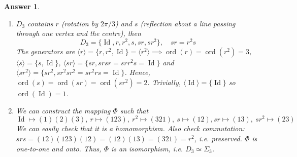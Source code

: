 \documentclass[a4paper]{article}
\DeclareMathOperator{\ord}{ord}
\DeclareMathOperator{\Id}{Id}
\newtheorem{ans}{Answer}[section]
\theoremstyle{new}
\begin{document}
\begin{ans}
\begin{enumerate}[label=(\roman*)]
\begin{enumerate}[label=(\alph*)]
\item $D_3$ contains $r$ (rotation by $2\pi/3$) and $s$ (reflection about a line passing through one vertex and the centre), then 
$$D_3=\{\Id,r,r^2,s,sr,sr^2\},\quad sr=r^2s$$
The generators are $\langle r\rangle=\{r,r^2,\Id\}=\langle r^2\rangle\implies\ord(r)=\ord(r^2)=3$, $\langle s\rangle=\{s,\Id\}$, $\langle sr\rangle=\{sr,srsr=srr^2s=\Id\}$ and $\langle sr^2\rangle=\{sr^2,sr^2sr^2=sr^2rs=\Id\}$. Hence, $\ord(s)=\ord(sr)=\ord(sr^2)=2$. Trivially, $\langle\Id\rangle=\{\Id\}$ so $\ord(\Id)=1$.
\item We can construct the mapping $\Phi$ such that
$$\Id\mapsto(1)(2)(3),~ r\mapsto(123),~r^2\mapsto(321),~s\mapsto(12),sr\mapsto(13),~sr^2\mapsto(23)$$
We can easily check that it is a homomorphism. Also check commutation: $srs=(12)(123)(12)=(12)(13)=(321)=r^2$, i.e. preserved. $\Phi$ is one-to-one and onto. Thus, $\Phi$ is an isomorphism, i.e. $D_3\simeq\Sigma_3$.
\end{enumerate}
\end{enumerate}
\end{ans}
\newpage
\end{document}
